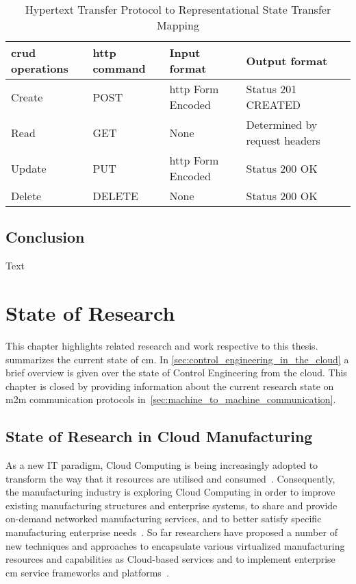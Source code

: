 \documentclass[
a4paper,
twoside,
headsepline,
cleardoublepage=empty,
parskip=half,
draft=false
]{scrbook}
\begin{document}
			\begin{table}[!h]
				\centering
				\caption{Hypertext Transfer Protocol to Representational State Transfer Mapping}
				\label{tab:http_rest_mapping}
				\begin{tabular}{@{}llll@{}}
					\toprule
					\gls{crud} operations & \gls{http} command & Input format & Output format
					\\ \midrule
					Create & POST & \gls{http} Form Encoded & Status 201 CREATED
					\\ \midrule
					Read & GET & None & Determined by request headers 
					\\ \midrule
					Update & PUT & \gls{http} Form Encoded & Status 200 OK
					\\ \midrule
					Delete & DELETE & None & Status 200 OK
					\\ \bottomrule
				\end{tabular}
			\end{table}
		
		\section*{Conclusion}\label{sec:state_of_the_art_conclusion}
		
			Text

	\chapter{State of Research} \label{ch:state_of_the_Science}

		This chapter highlights related research and work respective to this thesis.  summarizes the current state of \gls{cm}. In \cref{sec:control_engineering_in_the_cloud} a brief overview is given over the state of Control Engineering from the cloud. This chapter is closed by providing information about the current research state on \gls{m2m} communication protocols in~\cref{sec:machine_to_machine_communication}.

		\section{State of Research in Cloud Manufacturing}\label{sec:state_of_science_cloud_manufacturing}

			As a new IT paradigm, Cloud Computing is being increasingly adopted to transform the way that \gls{it} resources are utilised and consumed~\cite{li2010cloud}. 
			Consequently, the manufacturing industry is exploring Cloud Computing in order to improve existing manufacturing structures and enterprise systems, to
			share and provide on-demand networked manufacturing services, and to better satisfy specific manufacturing enterprise needs~\cite{he2015state}.
			So far researchers have proposed a number of new techniques and approaches to encapsulate various virtualized manufacturing resources and capabilities as Cloud-based services and to implement enterprise \gls{cm} service frameworks and platforms~\cite{tao2011cloud}.
			
\end{document}
